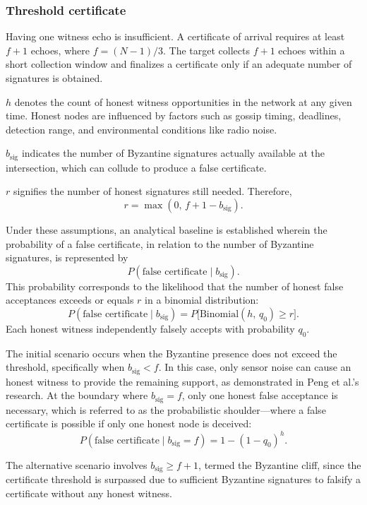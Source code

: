\documentclass[letterpaper,10pt,conference]{IEEEtran}
\begin{document}
\subsubsection{Threshold certificate}


Having one witness echo is insufficient. A certificate of arrival requires at least \(f+1\) echoes, where \(f = (N-1)/3\). The target collects \(f+1\) echoes within a short collection window and finalizes a certificate only if an adequate number of signatures is obtained.

\(h\) denotes the count of honest witness opportunities in the network at any given time. Honest nodes are influenced by factors such as gossip timing, deadlines, detection range, and environmental conditions like radio noise.

\(b_{\text{sig}}\) indicates the number of Byzantine signatures actually available at the intersection, which can collude to produce a false certificate.

\(r\) signifies the number of honest signatures still needed. Therefore,
\[
r = \max(0,\, f+1 - b_{\text{sig}}).
\]

Under these assumptions, an analytical baseline is established wherein the probability of a false certificate, in relation to the number of Byzantine signatures, is represented by
\[
P(\text{false certificate} \mid b_{\text{sig}}).
\]
This probability corresponds to the likelihood that the number of honest false acceptances exceeds or equals \(r\) in a binomial distribution:
\[
P(\text{false certificate} \mid b_{\text{sig}})
  = P\big[\mathrm{Binomial}(h,\, q_0) \ge r\big].
\]
Each honest witness independently falsely accepts with probability \(q_0\).

The initial scenario occurs when the Byzantine presence does not exceed the threshold, specifically when \(b_{\text{sig}} < f\). In this case, only sensor noise can cause an honest witness to provide the remaining support, as demonstrated in Peng et al.'s research. At the boundary where \(b_{\text{sig}} = f\), only one honest false acceptance is necessary, which is referred to as the probabilistic shoulder—where a false certificate is possible if only one honest node is deceived:
\[
P(\text{false certificate} \mid b_{\text{sig}} = f) = 1 - (1-q_0)^h.
\]

The alternative scenario involves \(b_{\text{sig}} \ge f+1\), termed the Byzantine cliff, since the certificate threshold is surpassed due to sufficient Byzantine signatures to falsify a certificate without any honest witness.
\end{document}
